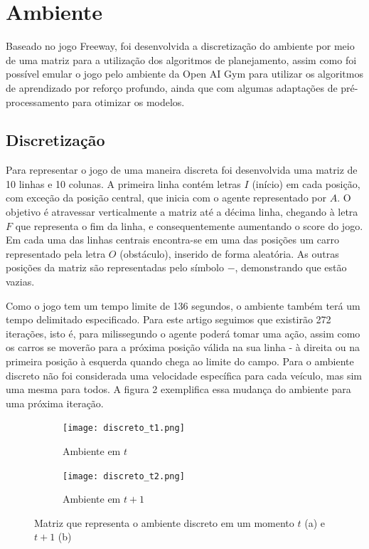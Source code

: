 \documentclass[letterpaper]{article} %
\begin{document}
\section{Ambiente}
Baseado no jogo Freeway, foi desenvolvida a discretização do ambiente por meio de uma matriz para a utilização dos algoritmos de planejamento, assim como foi possível emular o jogo pelo ambiente da Open AI Gym para utilizar os algoritmos de aprendizado por reforço profundo, ainda que com algumas adaptações de pré-processamento para otimizar os modelos.

\subsection{Discretização}
Para representar o jogo de uma maneira discreta foi desenvolvida uma matriz de 10 linhas e 10 colunas. A primeira linha contém letras $I$ (início) em cada posição, com exceção da posição central, que inicia com o agente representado por $A$. O objetivo é atravessar verticalmente a matriz até a décima linha, chegando à letra $F$ que representa o fim da linha, e consequentemente aumentando o score do jogo. Em cada uma das linhas centrais encontra-se em uma das posições um carro representado pela letra $O$ (obstáculo), inserido de forma aleatória. As outras posições da matriz são representadas pelo símbolo $-$, demonstrando que estão vazias. 

Como o jogo tem um tempo limite de 136 segundos, o ambiente também terá um tempo delimitado especificado. Para este artigo seguimos que existirão 272 iterações, isto é, para milissegundo o agente poderá tomar uma ação, assim como os carros se moverão para a próxima posição válida na sua linha - à direita ou na primeira posição à esquerda quando chega ao limite do campo. Para o ambiente discreto não foi considerada uma velocidade específica para cada veículo, mas sim uma mesma para todos. A figura 2 exemplifica essa mudança do ambiente para uma próxima iteração.


\begin{figure}[h]
     \begin{subfigure}[h]{0.2\textwidth}
         \centering
         \texttt{[image: discreto\_t1.png]}
         \caption{Ambiente em $t$}
     \end{subfigure}
     \hfill
     \begin{subfigure}[h]{0.2\textwidth}
         \texttt{[image: discreto\_t2.png]}
         \caption{Ambiente em $t+1$}
     \end{subfigure}
        \caption{Matriz que representa o ambiente discreto em um momento $t$ (a) e $t+1$ (b)}
\end{figure}
\end{document}
